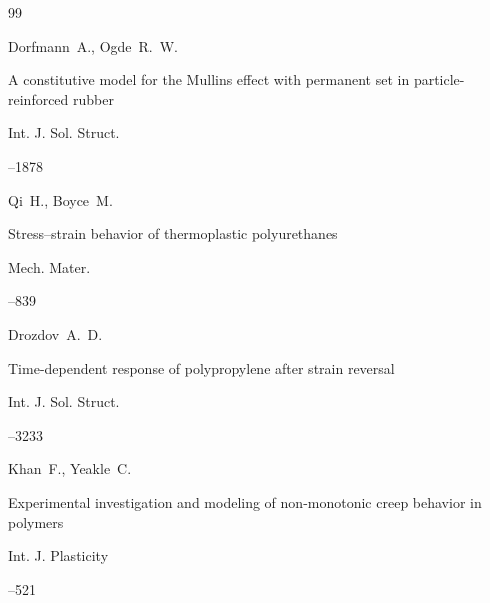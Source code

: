 \begin{thebibliography}{99}

\by Dorfmann~A., Ogde~R.~W. 

\paper A constitutive model for the Mullins effect with permanent set in particle-reinforced rubber

\jour Int. J. Sol. Struct.




--1878







\by Qi~H., Boyce~M.

\paper Stress--strain behavior of thermoplastic polyurethanes

\jour Mech. Mater.




--839







\by Drozdov~A.~D.

\paper Time-dependent response of polypropylene after strain reversal

\jour Int. J. Sol. Struct.




--3233







\by Khan~F., Yeakle~C.

\paper Experimental investigation and modeling of non-monotonic creep behavior in polymers

\jour Int. J. Plasticity




--521







\end{thebibliography}
